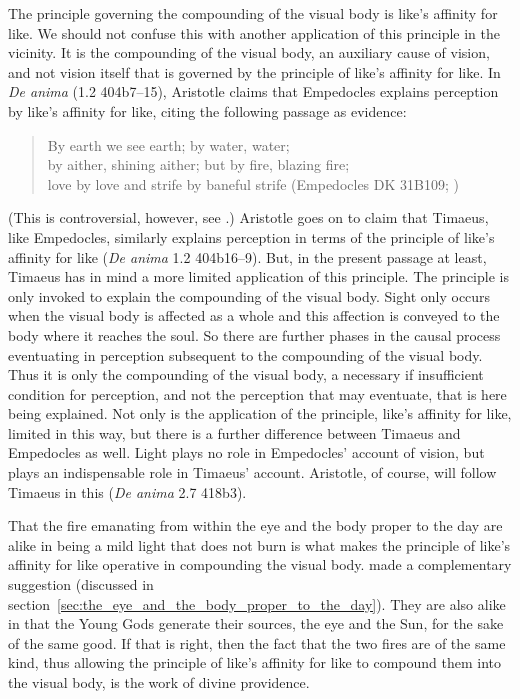The principle governing the compounding of the visual body is like's affinity for like. We should not confuse this with another application of this principle in the vicinity. It is the compounding of the visual body, an auxiliary cause of vision, and not vision itself that is governed by the principle of like's affinity for like. In \emph{De anima} (1.2 404b7--15), Aristotle claims that Empedocles explains perception by like's affinity for like, citing the following passage as evidence:
\begin{verse}
	By earth we see earth; by water, water;\\
	by aither, shining aither; but by fire, blazing fire;\\
	love by love and strife by baneful strife (Empedocles DK 31B109; \citealt[221]{Inwood:2001ve})
\end{verse} 
(This is controversial, however, see \citealt{Kamtekar:2009fk}.) Aristotle goes on to claim that Timaeus, like Empedocles, similarly explains perception in terms of the principle of like's affinity for like (\emph{De anima} 1.2 404b16--9). But, in the present passage at least, Timaeus has in mind a more limited application of this principle. The principle is only invoked to explain the compounding of the visual body. Sight only occurs when the visual body is affected as a whole and this affection is conveyed to the body where it reaches the soul. So there are further phases in the causal process eventuating in perception subsequent to the compounding of the visual body. Thus it is only the compounding of the visual body, a necessary if insufficient condition for perception, and not the perception that may eventuate, that is here being explained. Not only is the application of the principle, like's affinity for like, limited in this way, but there is a further difference between Timaeus and Empedocles as well. Light plays no role in Empedocles' account of vision, but plays an indispensable role in Timaeus' account. Aristotle, of course, will follow Timaeus in this (\emph{De anima} 2.7 418b3).

That the fire emanating from within the eye and the body proper to the day are alike in being a mild light that does not burn is what makes the principle of like's affinity for like operative in compounding the visual body. \citet[112]{Johansen:2004dx} made a complementary suggestion (discussed in section~\ref{sec:the_eye_and_the_body_proper_to_the_day}). They are also alike in that the Young Gods generate their sources, the eye and the Sun, for the sake of the same good. If that is right, then the fact that the two fires are of the same kind, thus allowing the principle of like's affinity for like to compound them into the visual body, is the work of divine providence.

